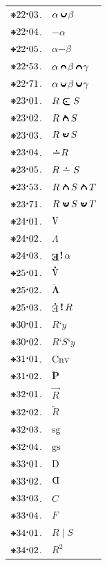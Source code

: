 \documentclass[12pt,openany,leqno,twocolumn]{book}
\newcommand{\pmast}{\text{\resizebox{!}{.75\height}{\ding{107}}}} %
\newcommand{\pmcdot}{\text{\raisebox{.05cm}{$\boldsymbol\cdot$}}} %
\newcommand{\pmbreve}[1]{\mathbf{\breve{\text{$#1$}}}}
\newcommand{\pmcirc}[1]{\mathbf{\dot{\text{$#1$}}}}
\newcommand{\pmshr}{\textbf{!}} %
\newcommand{\pmcinc}{\mathop{\ooalign{$\boldsymbol{\subset}$\cr\hidewidth$\hspace{.1em}\boldsymbol{\subset}$\cr\hidewidth$\hspace{.15em}\boldsymbol{\subset}$\cr\hidewidth$\hspace{.2em}\boldsymbol{\subset}$}}} %
\newcommand{\pmccap}{\mathop{\ooalign{\scalebox{1.3}[1.75]{$\put(3, 2){\oval(4,1)[t]}\phantom{\circ}$}\cr\hidewidth\hspace{.1em}\scalebox{1.3}[1.75]{$\put(3, 2){\oval(4,1)[t]}\phantom{\circ}$}\cr\hidewidth\hspace{.2em}\scalebox{1.3}[1.75]{$\put(3, 2){\oval(4,1)[t]}\phantom{\circ}$}\cr\hidewidth\hspace{.3em}\scalebox{1.3}[1.75]{$\put(3, 2){\oval(4,1)[t]}\phantom{\circ}$}\cr\hidewidth\hspace{.4em}\scalebox{1.3}[1.75]{$\put(3, 2){\oval(4,1)[t]}\phantom{\circ}$}\cr\hidewidth\hspace{.5em}\scalebox{1.3}[1.75]{$\put(3, 2){\oval(4,1)[t]}\phantom{\circ}$}\cr\hidewidth\hspace{.6em}\scalebox{1.3}[1.75]{$\put(3, 2){\oval(4,1)[t]}\phantom{\circ}$}}}} %
\newcommand{\pmccup}{\mathop{\ooalign{\scalebox{1.3}[1.75]{$\put(3, 2.5){\oval(4,4)[b]}\phantom{\circ}$}\cr\hidewidth\hspace{.1em}\scalebox{1.3}[1.75]{$\put(3, 2.5){\oval(4,4)[b]}\phantom{\circ}$}\cr\hidewidth\hspace{.2em}\scalebox{1.3}[1.75]{$\put(3, 2.5){\oval(4,4)[b]}\phantom{\circ}$}\cr\hidewidth\hspace{.3em}\scalebox{1.3}[1.75]{$\put(3, 2.5){\oval(4,4)[b]}\phantom{\circ}$}\cr\hidewidth\hspace{.4em}\scalebox{1.3}[1.75]{$\put(3, 2.5){\oval(4,4)[b]}\phantom{\circ}$}\cr\hidewidth\hspace{.5em}\scalebox{1.3}[1.75]{$\put(3, 2.5){\oval(4,4)[b]}\phantom{\circ}$}\cr\hidewidth\hspace{.6em}\scalebox{1.3}[1.75]{$\put(3, 2.5){\oval(4,4)[b]}\phantom{\circ}$}}}} %
\newcommand{\pmccmp}[1]{\boldsymbol{-}#1} %
\newcommand{\pmcmin}[2]{#1\boldsymbol{-}#2} %
\newcommand{\pmcuni}{\text{\rotatebox[origin=c]{180}{$\Lambda$}}} %
\newcommand{\pmcnull}{\Lambda} %
\newcommand{\pmcexists}{\text{\raisebox{.5em}{\rotatebox{180}{\textbf{E}}}}\hspace{-.1em}\mathop{\pmshr}} %
\newcommand{\pmrcmp}[1]{\ooalign{$\hidewidth\raisebox{.25em}{$\boldsymbol{\cdot}$}\hidewidth$\cr$\boldsymbol{\pmccmp}$}#1} %
\newcommand{\pmrmin}[2]{#1\mathrel{\ooalign{$\hidewidth\raisebox{.25em}{$\boldsymbol{\cdot}$}\hidewidth$\cr$\boldsymbol{\pmccmp}$}}#2} %
\newcommand{\pmruni}{\pmcirc{\text{\rotatebox[origin=c]{180}{$\Lambda$}}}} %
\newcommand{\pmrnull}{\pmcirc{\Lambda}} %
\newcommand{\pmrexists}{\pmcirc{\mathop{\text{\raisebox{.5em}{\rotatebox{180}{E}}}}}\mathop{\pmshr}} %
\newcommand{\pmrinc}{\mathrel{\ooalign{$\hidewidth\boldsymbol{\cdot}\hidewidth$\cr$\boldsymbol{\pmcinc}$}}} %
\newcommand{\pmrcap}{\mathrel{\ooalign{$\hidewidth\raisebox{.3em}{$\boldsymbol{\cdot}$}\hidewidth$\cr$\mathbf{\pmccap}$}}} %
\newcommand{\pmrcup}{\mathrel{\ooalign{$\hidewidth\raisebox{.1em}{$\boldsymbol{\cdot}$}\hidewidth$\cr$\mathbf{\pmccup}$}}} %
\newcommand{\pmdscf}[2]{#1\textbf{`}#2} %
\newcommand{\pmCnv}{\text{Cnv}}
\newcommand{\pmcrel}[1]{\pmbreve{#1}} %
\newcommand{\pmRrf}[1]{\overrightarrow{#1}}
\newcommand{\pmRrl}[1]{\overleftarrow{#1}}
\newcommand{\pmSg}{\text{sg}}
\newcommand{\pmGs}{\text{gs}}
\newcommand{\pmDm}{\text{D}}
\newcommand{\pmCdm}{\text{\rotatebox[origin=c]{180}{D}}}
\newcommand{\pmCmp}{C}
\newcommand{\pmFld}{F}
\newcommand{\pmrprd}[2]{{#1}\mathop{|}{#2}} %
\newcommand{\pmrprdn}[2]{#1^{#2}} %
\begin{document}
\begin{tabular}{l l}
$\pmast22\pmcdot03$. & $\alpha \pmccup \beta$ \\
$\pmast22\pmcdot04$. & $\pmccmp{\alpha}$ \\
$\pmast22\pmcdot05$. & $\pmcmin{\alpha}{\beta}$ \\
$\pmast22\pmcdot53$. & $\alpha \pmccap \beta \pmccap \gamma$ \\
$\pmast22\pmcdot71$. & $\alpha \pmccup \beta \pmccup \gamma$ \\
$\pmast23\pmcdot01$. & $R \pmrinc S$ \\
$\pmast23\pmcdot02$. & $R \pmrcap S$ \\
$\pmast23\pmcdot03$. & $R \pmrcup S$ \\
$\pmast23\pmcdot04$. & $\pmrcmp{R}$ \\
$\pmast23\pmcdot05$. & $\pmrmin{R}{S}$ \\
$\pmast23\pmcdot53$. & $R \pmrcap S \pmrcap T$ \\
$\pmast23\pmcdot71$. & $R \pmrcup S \pmrcup T$ \\
$\pmast24\pmcdot01$. & $\pmcuni$ \\
$\pmast24\pmcdot02$. & $\pmcnull$ \\
$\pmast24\pmcdot03$. & $\pmcexists \alpha$ \\
$\pmast25\pmcdot01$. & $\pmruni$ \\
$\pmast25\pmcdot02$. & $\pmrnull$ \\
$\pmast25\pmcdot03$. & $\pmrexists R$ \\
$\pmast30\pmcdot01$. & $\pmdscf{R}{y}$ \\
$\pmast30\pmcdot02$. & $\pmdscf{R}{\pmdscf{S}{y}}$ \\
$\pmast31\pmcdot01$. & $\pmCnv$ \\
$\pmast31\pmcdot02$. & $\pmcrel{P}$ \\
$\pmast32\pmcdot01$. & $\pmRrf{R}$ \\
$\pmast32\pmcdot02$. & $\pmRrl{R}$ \\
$\pmast32\pmcdot03$. & $\pmSg$ \\
$\pmast32\pmcdot04$. & $\pmGs$ \\
$\pmast33\pmcdot01$. & $\pmDm$ \\
$\pmast33\pmcdot02$. & $\pmCdm$ \\
$\pmast33\pmcdot03$. & $\pmCmp$ \\
$\pmast33\pmcdot04$. & $\pmFld$ \\
$\pmast34\pmcdot01$. & $\pmrprd{R}{S}$ \\
$\pmast34\pmcdot02$. & $\pmrprdn{R}{2}$ 
\end{tabular}
\end{document}
